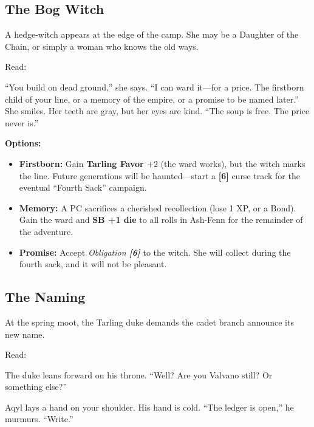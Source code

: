 \documentclass[11pt,a5paper]{book}
\newcommand{\sb}[1]{\textbf{SB #1}}
\newcommand{\timer}[1]{\textbf{[#1]}}
\newcommand{\condition}[1]{\textit{#1}}
\begin{document}
\subsection*{The Bog Witch}

A hedge-witch appears at the edge of the camp. She may be a Daughter of the Chain, or simply a woman who knows the old ways.

Read:
\begin{quoting}
``You build on dead ground,'' she says. ``I can ward it---for a price. The firstborn child of your line, or a memory of the empire, or a promise to be named later.'' She smiles. Her teeth are gray, but her eyes are kind. ``The soup is free. The price never is.''
\end{quoting}

\textbf{Options:}
\begin{itemize}[leftmargin=*]
\item \textbf{Firstborn:} Gain \textbf{Tarling Favor $+2$} (the ward works), but the witch marks the line. Future generations will be haunted---start a \timer{6} curse track for the eventual ``Fourth Sack'' campaign.
\item \textbf{Memory:} A PC sacrifices a cherished recollection (lose 1 XP, or a Bond). Gain the ward and \sb{+1 die} to all rolls in Ash-Fenn for the remainder of the adventure.
\item \textbf{Promise:} Accept \condition{Obligation \timer{6}} to the witch. She will collect during the fourth sack, and it will not be pleasant.
\end{itemize}

\subsection*{The Naming}

At the spring moot, the Tarling duke demands the cadet branch announce its new name.

Read:
\begin{quoting}
The duke leans forward on his throne. ``Well? Are you Valvano still? Or something else?'' 

Aqyl lays a hand on your shoulder. His hand is cold. ``The ledger is open,'' he murmurs. ``Write.''
\end{quoting}
\end{document}
